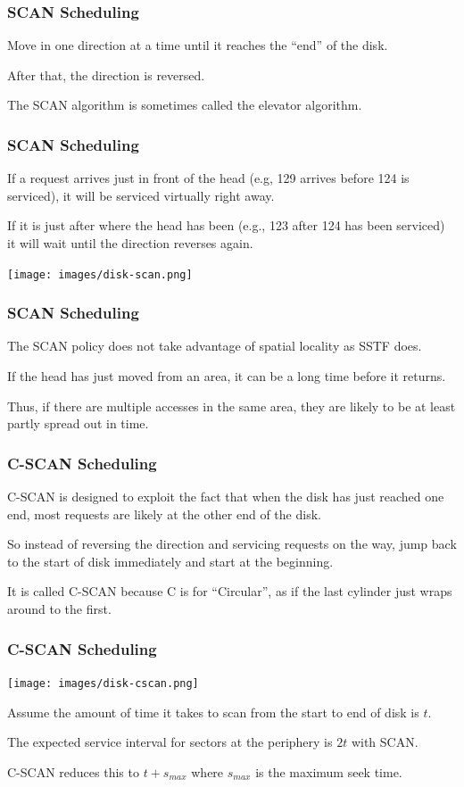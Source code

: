 \begin{frame}
\frametitle{SCAN Scheduling}

Move in one direction at a time until it reaches the ``end'' of the disk. 

After that, the direction is reversed. 

The SCAN algorithm is sometimes called the elevator algorithm.
\end{frame}

\begin{frame}
\frametitle{SCAN Scheduling}

If a request arrives just in front of the head (e.g, 129 arrives before 124 is serviced), it will be serviced virtually right away.

If it is just after where the head has been (e.g., 123 after 124 has been serviced) it will wait until the direction reverses again. 

\begin{center}
	\texttt{[image: images/disk-scan.png]}
\end{center}


\end{frame}

\begin{frame}
\frametitle{SCAN Scheduling}

The SCAN policy does not take advantage of spatial locality as SSTF does. 

If the head has just moved from an area, it can be a long time before it returns.

Thus, if there are multiple accesses in the same area, they are likely to be at least partly spread out in time.

\end{frame}

\begin{frame}
\frametitle{C-SCAN Scheduling}

C-SCAN is designed to exploit the fact that when the disk has just reached one end, most requests are likely at the other end of the disk. 

So instead of reversing the direction and servicing requests on the way, jump back to the start of disk immediately and start at the beginning. 

It is called C-SCAN because C is for ``Circular'', as if the last cylinder just wraps around to the first.

\end{frame}

\begin{frame}
\frametitle{C-SCAN Scheduling}

\begin{center}
	\texttt{[image: images/disk-cscan.png]}
\end{center}

Assume the amount of time it takes to scan from the start to end of disk is $t$. 

The expected service interval for sectors at the periphery is $2t$  with SCAN. 

C-SCAN reduces this to $t + s_{max}$ where $s_{max}$ is the maximum seek time.

\end{frame}

